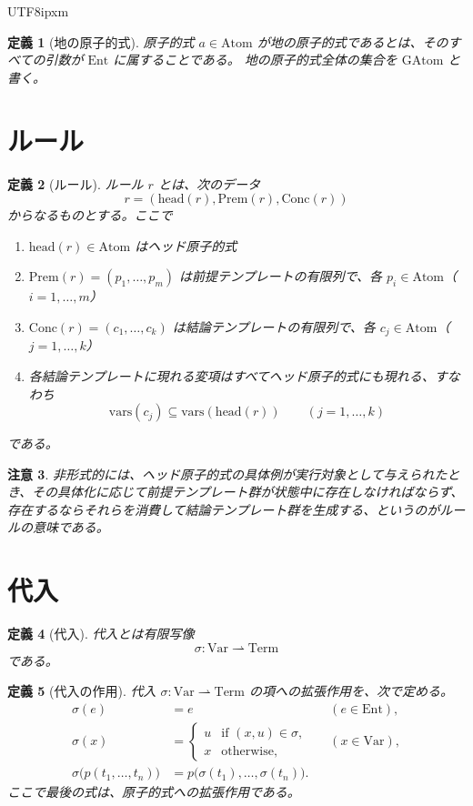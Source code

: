 \documentclass[a4paper,11pt]{bxjsarticle}
\newcommand{\JPCJKfamily}{ipxm}
\newtheorem{definition}{定義}[section]
\newtheorem{remark}[definition]{注意}
\newcommand{\Ent}{\mathrm{Ent}}
\newcommand{\Var}{\mathrm{Var}}
\newcommand{\Term}{\mathrm{Term}}
\newcommand{\Atom}{\mathrm{Atom}}
\newcommand{\GAtom}{\mathrm{GAtom}}
\newcommand{\headsym}{\mathrm{head}}
\newcommand{\Prem}{\mathrm{Prem}}
\newcommand{\Conc}{\mathrm{Conc}}
\newcommand{\vars}{\mathrm{vars}}
\begin{document}
\begin{CJK}{UTF8}{\JPCJKfamily}
\begin{definition}[地の原子的式]
原子的式 $a \in \Atom$ が\emph{地の原子的式}であるとは、そのすべての引数が $\Ent$ に属することである。
地の原子的式全体の集合を $\GAtom$ と書く。
\end{definition}

\section{ルール}

\begin{definition}[ルール]
ルール $r$ とは、次のデータ
\[
r = (\headsym(r), \Prem(r), \Conc(r))
\]
からなるものとする。ここで
\begin{enumerate}[label=\arabic*.]
\item $\headsym(r) \in \Atom$ はヘッド原子的式
\item $\Prem(r) = (p_1,\dots,p_m)$ は前提テンプレートの有限列で、各 $p_i \in \Atom$（$i=1,\dots,m$）
\item $\Conc(r) = (c_1,\dots,c_k)$ は結論テンプレートの有限列で、各 $c_j \in \Atom$（$j=1,\dots,k$）
\item 各結論テンプレートに現れる変項はすべてヘッド原子的式にも現れる、すなわち
\[
\vars(c_j) \subseteq \vars(\headsym(r)) \qquad (j=1,\dots,k)
\]
\end{enumerate}
である。
\end{definition}

\begin{remark}
非形式的には、ヘッド原子的式の具体例が実行対象として与えられたとき、その具体化に応じて前提テンプレート群が状態中に存在しなければならず、存在するならそれらを消費して結論テンプレート群を生成する、というのがルールの意味である。
\end{remark}

\section{代入}

\begin{definition}[代入]
代入とは有限写像
\[
\sigma : \Var \rightharpoonup \Term
\]
である。
\end{definition}

\begin{definition}[代入の作用]
代入 $\sigma: \Var \rightharpoonup \Term$ の項への拡張作用を、次で定める。
\begin{align*}
\sigma(e) &= e \qquad &&(e \in \Ent), \\
\sigma(x) &=
\begin{cases}
u & \text{if } (x,u) \in \sigma, \\
x & \text{otherwise},
\end{cases}
&& (x \in \Var), \\
\sigma\bigl(p(t_1,\dots,t_n)\bigr) &= p\bigl(\sigma(t_1),\dots,\sigma(t_n)\bigr).
\end{align*}
ここで最後の式は、原子的式への拡張作用である。
\end{definition}


\end{CJK}
\end{document}
